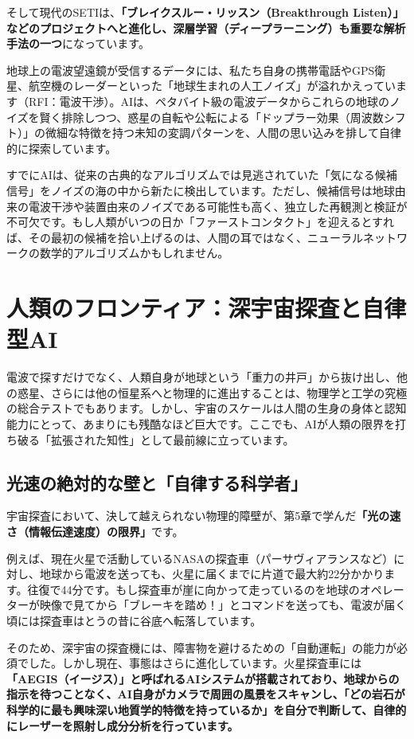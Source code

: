 そして現代のSETIは、\textbf{「ブレイクスルー・リッスン（Breakthrough Listen）」などのプロジェクトへと進化し、深層学習（ディープラーニング）も重要な解析手法の一つ}になっています。

地球上の電波望遠鏡が受信するデータには、私たち自身の携帯電話やGPS衛星、航空機のレーダーといった「地球生まれの人工ノイズ」が溢れかえっています（RFI：電波干渉）。AIは、ペタバイト級の電波データからこれらの地球のノイズを賢く排除しつつ、惑星の自転や公転による「ドップラー効果（周波数シフト）」の微細な特徴を持つ未知の変調パターンを、人間の思い込みを排して自律的に探索しています。

すでにAIは、従来の古典的なアルゴリズムでは見逃されていた「気になる候補信号」をノイズの海の中から新たに検出しています。ただし、候補信号は地球由来の電波干渉や装置由来のノイズである可能性も高く、独立した再観測と検証が不可欠です。もし人類がいつの日か「ファーストコンタクト」を迎えるとすれば、その最初の候補を拾い上げるのは、人間の耳ではなく、ニューラルネットワークの数学的アルゴリズムかもしれません。

\section{人類のフロンティア：深宇宙探査と自律型AI}

電波で探すだけでなく、人類自身が地球という「重力の井戸」から抜け出し、他の惑星、さらには他の恒星系へと物理的に進出することは、物理学と工学の究極の総合テストでもあります。しかし、宇宙のスケールは人間の生身の身体と認知能力にとって、あまりにも残酷なほど巨大です。ここでも、AIが人類の限界を打ち破る「拡張された知性」として最前線に立っています。

\subsection{光速の絶対的な壁と「自律する科学者」}

宇宙探査において、決して越えられない物理的障壁が、第5章で学んだ\textbf{「光の速さ（情報伝達速度）の限界」}です。

例えば、現在火星で活動しているNASAの探査車（パーサヴィアランスなど）に対し、地球から電波を送っても、火星に届くまでに片道で最大約22分かかります。往復で44分です。もし探査車が崖に向かって走っているのを地球のオペレーターが映像で見てから「ブレーキを踏め！」とコマンドを送っても、電波が届く頃には探査車はとうの昔に谷底へ転落しています。

そのため、深宇宙の探査機には、障害物を避けるための「自動運転」の能力が必須でした。しかし現在、事態はさらに進化しています。火星探査車には\textbf{「AEGIS（イージス）」と呼ばれるAIシステムが搭載されており、地球からの指示を待つことなく、AI自身がカメラで周囲の風景をスキャンし、「どの岩石が科学的に最も興味深い地質学的特徴を持っているか」を自分で判断して、自律的にレーザーを照射し成分分析を行っています。}

